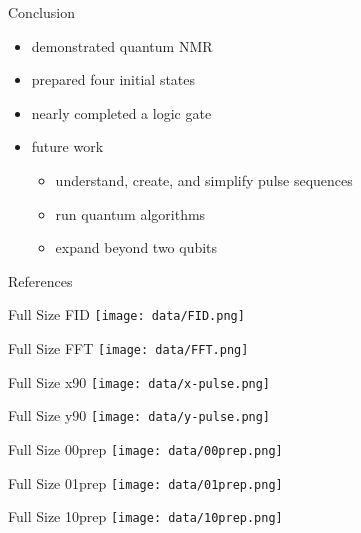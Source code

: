 \documentclass{beamer}
\begin{document}
\begin{frame}{Conclusion}
	\begin{itemize}
	\item demonstrated quantum NMR
	\item prepared four initial states
	\item nearly completed a logic gate
	\vspace{1em}
	\item future work
		\begin{itemize}
		\item understand, create, and simplify pulse sequences
		\item run quantum algorithms
		\item expand beyond two qubits
		\end{itemize}
	\end{itemize}
\end{frame}

\begin{frame}{References}

\end{frame}

\begin{frame}{Full Size FID}
	\texttt{[image: data/FID.png]}
\end{frame}

\begin{frame}{Full Size FFT}
	\texttt{[image: data/FFT.png]}
\end{frame}

\begin{frame}{Full Size x90}
	\texttt{[image: data/x-pulse.png]}
\end{frame}

\begin{frame}{Full Size y90}
	\texttt{[image: data/y-pulse.png]}
\end{frame}

\begin{frame}{Full Size 00prep}
	\texttt{[image: data/00prep.png]}
\end{frame}

\begin{frame}{Full Size 01prep}
	\texttt{[image: data/01prep.png]}
\end{frame}

\begin{frame}{Full Size 10prep}
	\texttt{[image: data/10prep.png]}
\end{frame}
\end{document}
